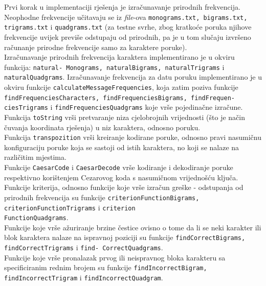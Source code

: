 \documentclass[12pt, a4paper]{article}
\begin{document}
Prvi korak u implementaciji rješenja je izračunavanje prirodnih frekvencija. Neophodne frekvencije učitavaju se iz \textit{file}-ova \texttt{monograms.txt, bigrams.txt, trigrams.txt} i \texttt{quadgrams.txt} (za testne svrhe, zbog kratkoće poruka njihove frekvencije uvijek previše odstupaju od prirodnih, pa je u tom slučaju izvršeno računanje prirodne frekvencije samo za karaktere poruke). \\

Izračunavanje prirodnih frekvencija karaktera implementirano je u okviru funkcija: \texttt{natural- Monograms, naturalBigrams, naturalTrigrams} i \texttt{naturalQuadgrams}. Izračunavanje frekvencija za datu poruku implementirano je u okviru funkcije \texttt{calculateMessageFrequencies}, koja zatim poziva funkcije \texttt{findFrequenciesCharacters, findFrequenciesBigrams, findFrequen- ciesTrigrams} i \texttt{findFrequenciesQuadgrams} koje vrše pojedinačne izračune. \\

Funkcija \texttt{toString} vrši pretvaranje niza cjelobrojnih vrijednosti (što je način čuvanja koordinata rješenja) u niz karaktera, odnosno poruku. \\

Funkcija \texttt{transpozition} vrši kreiranje kodirane poruke, odnosno pravi nasumičnu konfiguraciju poruke koja se sastoji od istih karaktera, no koji se nalaze na različitim mjestima. \\

Funkcije \texttt{CaesarCode} i \texttt{CaesarDecode} vrše kodiranje i dekodiranje poruke respektivno korištenjem Cezarovog koda s nasumičnom vrijednošću ključa. \\

Funkcije kriterija, odnosno funkcije koje vrše izračun greške - odstupanja od prirodnih frekvencija su funkcije \texttt{criterionFunctionBigrams, criterionFunctionTrigrams} i \texttt{criterion \\ FunctionQuadgrams}. \\

Funkcije koje vrše ažuriranje brzine čestice ovisno o tome da li se neki karakter ili blok karaktera nalaze na ispravnoj poziciji su funkcije \texttt{findCorrectBigrams, findCorrectTrigrams} i \texttt{find- CorrectQuadgrams}. \\

Funkcije koje vrše pronalazak prvog ili neispravnog bloka karakteru sa specificiranim rednim brojem su funkcije \texttt{findIncorrectBigram, findIncorrectTrigram} i \texttt{findIncorrectQuadgram}. \\
\end{document}
